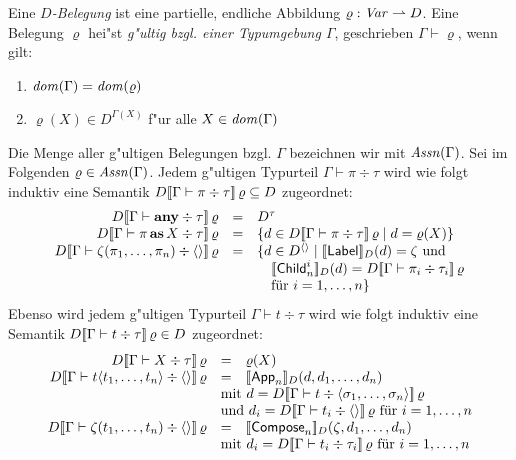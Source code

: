 \documentclass[%
  12pt,%
  a4paper,%
]{article}
\DeclareMathOperator{\as}{\textbf{as}}
\newcommand{\any}{\textbf{any}}
\newcommand{\Tj}[3]{{#1}\vdash{#2}\div{#3}}
\begin{document}
Eine \emph{$D$-Belegung} ist eine partielle, endliche Abbildung $\varrho: \mathit{Var} \rightharpoonup D$. Eine Belegung
$\varrho$ hei"st \emph{g"ultig bzgl. einer Typumgebung $\Gamma$}, geschrieben $\Gamma \vdash \varrho$,
wenn gilt:
\begin{enumerate}
\item $\mathit{dom}(\Gamma) = \mathit{dom}(\varrho)$
\item $\varrho(X) \in D^{\Gamma(X)}$ f"ur alle $X \in \mathit{dom}(\Gamma)$
\end{enumerate}
Die Menge aller g"ultigen Belegungen bzgl. $\Gamma$ bezeichnen wir mit $\mathit{Assn}(\Gamma)$.
Sei im Folgenden $\varrho \in \mathit{Assn}(\Gamma)$.
Jedem g"ultigen Typurteil $\Tj{\Gamma}{\pi}{\tau}$ wird wie folgt induktiv
eine Semantik $D\sem{\Tj{\Gamma}{\pi}{\tau}}\,\varrho \subseteq D$ zugeordnet:
\[\begin{array}{rcl}
  D\sem{\Tj{\Gamma}{\any}{\tau}}\,\varrho
  &=& D^\tau
  \\
  D\sem{\Tj{\Gamma}{\pi \as X}{\tau}}\,\varrho
  &=& \{d \in D\sem{\Tj{\Gamma}{\pi}{\tau}}\,\varrho \mid d = \varrho(X) \}
  \\
  D\sem{\Tj{\Gamma}{\zeta(\pi_1,\ldots,\pi_n)}{\langle \rangle}}\,\varrho
  &=& \{ d \in D^{\langle \rangle} \mid \sem{\Label}_D(d) = \zeta \text{ und} \\
  && \quad \sem{\Child_n^i}_D(d) = D\sem{\Tj{\Gamma}{\pi_i}{\tau_i}}\,\varrho \\
  && \quad \text{f\"ur $i=1,\ldots,n$} \}
  \\
\end{array}\]
Ebenso wird jedem g"ultigen Typurteil $\Tj{\Gamma}{t}{\tau}$ wird wie folgt induktiv
eine Semantik $D\sem{\Tj{\Gamma}{t}{\tau}}\,\varrho \in D$ zugeordnet:
\[\begin{array}{rcl}
  D\sem{\Tj{\Gamma}{X}{\tau}}\,\varrho
  &=& \varrho(X)
  \\
  D\sem{\Tj{\Gamma}{t \langle t_1,\ldots,t_n \rangle}{\langle \rangle}}\,\varrho
  &=& \sem{\App_n}_D(d, d_1, \ldots, d_n) \\
  & \multicolumn{2}{l}{\text{mit } d = D\sem{\Tj{\Gamma}{t}{\langle\sigma_1,\ldots,\sigma_n\rangle}}\,\varrho} \\
  & \multicolumn{2}{l}{\text{und } d_i = D\sem{\Tj{\Gamma}{t_i}{\langle \rangle}}\,\varrho \text{ f\"ur $i=1,\ldots,n$}}
  \\
  D\sem{\Tj{\Gamma}{\zeta(t_1,\ldots,t_n)}{\langle \rangle}}\,\varrho
  &=& \sem{\Compose_n}_D(\zeta,d_1,\ldots,d_n) \\
  & \multicolumn{2}{l}{\text{mit } d_i = D\sem{\Tj{\Gamma}{t_i}{\tau_i}}\,\varrho \text{ f\"ur $i=1,\ldots,n$}}
  \\
\end{array}\]
\end{document}
